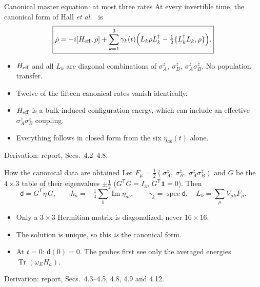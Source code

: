 \documentclass[aspectratio=169,11pt]{beamer}
\newcommand{\Tr}{\operatorname{Tr}}
\newcommand{\dmat}{\mathsf d}
\newcommand{\Heff}{H_{\rm eff}}
\newcommand{\report}[1]{{\color{muted}\footnotesize Derivation: report, #1.}}
\begin{document}
\begin{frame}{Canonical master equation: at most three rates}
At every invertible time, the canonical form of Hall \emph{et al.}~\cite{Hall2014} is
\[
\boxed{\dot\rho=-i[\Heff,\rho]+\sum_{k=1}^{3}\gamma_k(t)
\Bigl(L_k\rho L_k^\dagger-\tfrac12\{L_k^\dagger L_k,\rho\}\Bigr).}
\]
\begin{itemize}\setlength\itemsep{6pt}
\item $\Heff$ and all $L_k$ are diagonal combinations of
$\sigma_A^z,\ \sigma_B^z,\ \sigma_A^z\sigma_B^z$. No population transfer.
\item Twelve of the fifteen canonical rates vanish identically.
\item $\Heff$ is a bulk-induced configuration energy, which can include an
effective $\sigma_A^z\sigma_B^z$ coupling.
\item Everything follows in closed form from the six $\eta_{ab}(t)$ alone.
\end{itemize}
\report{Secs.~4.2--4.8}
\end{frame}

\begin{frame}{How the canonical data are obtained}
Let $F_\mu=\tfrac12(\sigma_A^z,\ \sigma_B^z,\ \sigma_A^z\sigma_B^z)$ and $G$ be the
$4\times3$ table of their eigenvalues $\pm\tfrac12$ ($G^{\mathsf T}G=I_3$,
$G^{\mathsf T}\mathbf1=0$). Then
\[
\boxed{\dmat=G^{\mathsf T}\eta\,G,\qquad
h_a=-\tfrac14\sum_b\operatorname{Im}\eta_{ab},\qquad
\gamma_k=\operatorname{spec}\dmat,\quad L_k=\textstyle\sum_\mu V_{\mu k}F_\mu.}
\]
\begin{itemize}\setlength\itemsep{6pt}
\item Only a $3\times3$ Hermitian matrix is diagonalized, never $16\times16$.
\item The solution is unique, so this \emph{is} the canonical form.
\item At $t=0$: $\dmat(0)=0$. The probes first see only the averaged
energies $\Tr(\omega_EH_a)$.
\end{itemize}
\report{Secs.~4.3--4.5, 4.8, 4.9 and 4.12}
\end{frame}
\end{document}

